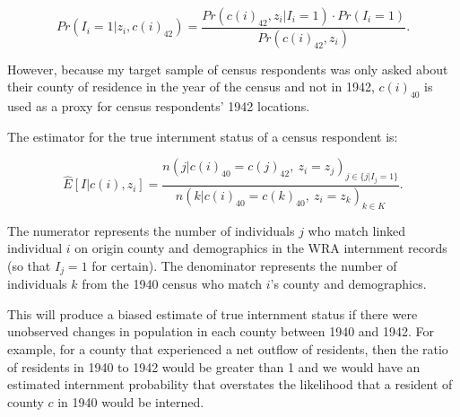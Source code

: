 \documentclass[12pt]{article}
\begin{document}
$$
Pr(I_i=1|z_i, c(i)_{42}) =
\frac{Pr\left(c(i)_{42}, z_i|I_i=1\right) \cdot Pr(I_i=1)}{Pr(c(i)_{42}, z_i)}.
$$

However, because my target sample of census respondents
was only asked about their county of residence in the year of the census
and not in 1942, \(c(i)_{40}\) is used as a proxy
for census respondents' 1942 locations.

The estimator for the true internment status of a census respondent is:

\begin{equation}\label{eq:predint}
\hat{E}[I|c(i), z_i] =
\frac{n(j |c(i)_{40}=c(j)_{42} , ~ z_i=z_j)_{j\in \{j | I_j = 1\}}}
{n(k | c(i)_{40}=c(k)_{40}, ~ z_i=z_k)_{k\in K}}.
\end{equation}

The numerator represents the number of individuals \(j\)
who match linked individual \(i\) on origin county and demographics
in the WRA internment records (so that \(I_j = 1\) for certain).
The denominator represents the number of individuals \(k\) from the 1940 census
who match \(i\)'s county and demographics.

This will produce a biased estimate of true internment status
if there were unobserved changes in population
in each county between 1940 and 1942.
For example, for a county that experienced a net outflow of residents,
then the ratio of residents in 1940 to 1942 would be greater than 1
and we would have an estimated internment probability
that overstates the likelihood that a resident of county \(c\) in 1940
would be interned.
\end{document}
